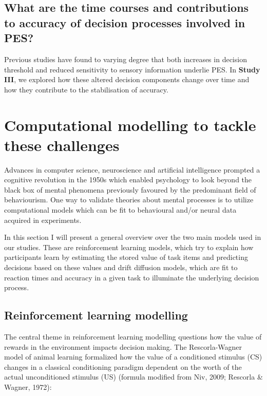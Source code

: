 \documentclass[12pt,openany]{book}
\theoremstyle{definition}
\theoremstyle{definition}
\theoremstyle{definition}
\theoremstyle{remark}
\begin{document}
\subsection{What are the time courses and contributions to accuracy of
decision processes involved in
PES?}\label{what-are-the-time-courses-and-contributions-to-accuracy-of-decision-processes-involved-in-pes}

Previous studies have found to varying degree that both increases in
decision threshold and reduced sensitivity to sensory information
underlie PES. In \textbf{Study III}, we explored how these altered
decision components change over time and how they contribute to the
stabilisation of accuracy.

\section{Computational modelling to tackle these
challenges}\label{computational-modelling-to-tackle-these-challenges}

Advances in computer science, neuroscience and artificial intelligence
prompted a cognitive revolution in the 1950s which enabled psychology to
look beyond the black box of mental phenomena previously favoured by the
predominant field of behaviourism. One way to validate theories about
mental processes is to utilize computational models which can be fit to
behavioural and/or neural data acquired in experiments.

In this section I will present a general overview over the two main
models used in our studies. These are reinforcement learning models,
which try to explain how participants learn by estimating the stored
value of task items and predicting decisions based on these values and
drift diffusion models, which are fit to reaction times and accuracy in
a given task to illuminate the underlying decision process.

\subsection{Reinforcement learning
modelling}\label{reinforcement-learning-modelling}

The central theme in reinforcement learning modelling questions how the
value of rewards in the environment impacts decision making. The
Rescorla-Wagner model of animal learning formalized how the value of a
conditioned stimulus (CS) changes in a classical conditioning paradigm
dependent on the worth of the actual unconditioned stimulus (US)
(formula modified from Niv, 2009; Rescorla \& Wagner, 1972):
\end{document}
